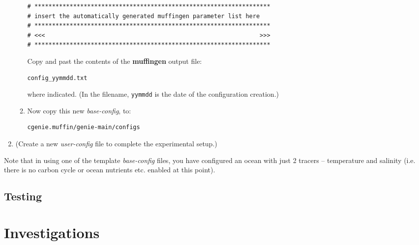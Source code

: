 \documentclass[11pt,fleqn]{book} %
\begin{document}
\begin{enumerate}
\begin{enumerate}
\begin{verbatim}
# *******************************************************************
# insert the automatically generated muffingen parameter list here
# *******************************************************************
# <<<                                                             >>>
# *******************************************************************
\end{verbatim}\vspace{-2pt}\normalsize
Copy and past the contents of the \textbf{muffingen} output file:
\vspace{-2pt}\begin{verbatim}
config_yymmdd.txt
\end{verbatim}\vspace{-2pt}
where indicated. (In the filename, \texttt{yymmdd} is the date of the configuration creation.)
\item Now copy this new \textit{base-config}, to:
\vspace{-4pt}\begin{verbatim}
cgenie.muffin/genie-main/configs
\end{verbatim}\vspace{-4pt}
\end{enumerate}
\vspace{2mm}
\item (Create a new \textit{user-config} file to complete the experimental setup.)
\end{enumerate}
\vspace{2mm}

\noindent Note that in using one of the template \textit{base-config} files, you have configured an ocean with just 2 tracers -- temperature and salinity (i.e. there is no carbon cycle or ocean nutrients etc. enabled at this point).


\subsection{Testing}



\newpage


\section{Investigations}
\end{document}
